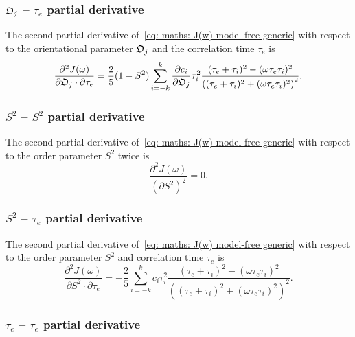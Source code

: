 \subsubsection{$\mathfrak{O}_j$ -- $\tau_e$ partial derivative}

The second partial derivative of~\eqref{eq: maths: J(w) model-free generic} with respect to the orientational parameter $\mathfrak{O}_j$ and the correlation time $\tau_e$ is
\begin{equation}
    \frac{\partial^2 J(\omega)}{\partial \mathfrak{O}_j \cdot \partial \tau_e} = \frac{2}{5} (1 - S^2) \sum_{i=-k}^k
        \frac{\partial c_i}{\partial \mathfrak{O}_j} \tau_i^2
        \frac{(\tau_e + \tau_i)^2 - (\omega \tau_e \tau_i)^2}{\left((\tau_e + \tau_i)^2 + (\omega \tau_e \tau_i)^2 \right)^2}.
\end{equation}



\subsubsection{$S^2$ -- $S^2$ partial derivative}

The second partial derivative of~\eqref{eq: maths: J(w) model-free generic} with respect to the order parameter $S^2$ twice is
\begin{equation}
    \frac{\partial^2 J(\omega)}{(\partial S^2)^2} = 0.
\end{equation}



\subsubsection{$S^2$ -- $\tau_e$ partial derivative}

The second partial derivative of~\eqref{eq: maths: J(w) model-free generic} with respect to the order parameter $S^2$ and correlation time $\tau_e$ is
\begin{equation}
    \frac{\partial^2 J(\omega)}{\partial S^2 \cdot \partial \tau_e} = -\frac{2}{5} \sum_{i=-k}^k c_i \tau_i^2
        \frac{(\tau_e + \tau_i)^2 - (\omega \tau_e \tau_i)^2}{\left((\tau_e + \tau_i)^2 + (\omega \tau_e \tau_i)^2 \right)^2}.
\end{equation}



\subsubsection{$\tau_e$ -- $\tau_e$ partial derivative}

